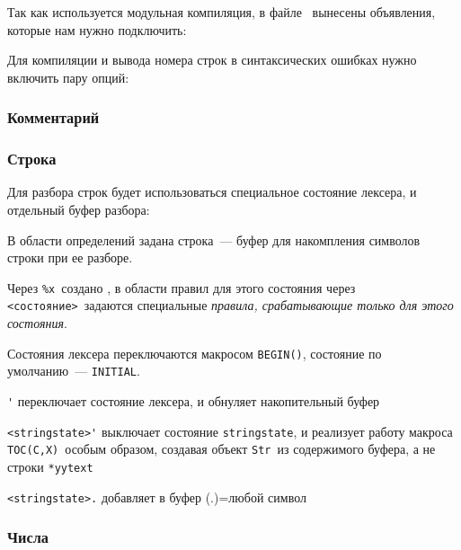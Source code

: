 \label{bilex}

Так как используется модульная компиляция, в файле \ вынесены
объявления, которые нам нужно подключить: 


Для компиляции и вывода номера строк в синтаксических ошибках
нужно включить пару опций:
 

\subsubsection{Комментарий}


\subsubsection{Строка}\label{lexstring}

Для разбора строк будет использоваться специальное состояние лексера,
и отдельный буфер разбора:  


В области определений задана строка\ --- буфер для накомпления символов строки
при ее разборе.

Через \verb|%x|\ создано ,
в области правил для этого состояния через \verb|<состояние>|\ задаются 
специальные \emph{правила, срабатывающие только для этого состояния}.

Состояния лексера переключаются макросом \verb|BEGIN()|, состояние по 
умолчанию\ --- \verb|INITIAL|.

\begin{description}
\item{\verb|'|} переключает состояние лексера, и обнуляет накопительный буфер
\item{\verb|<stringstate>'|} выключает состояние \verb|stringstate|,
и реализует работу макроса \verb|TOC(C,X)|\ особым образом, создавая объект
\verb|Str|\ из содержимого буфера, а не строки \verb|*yytext|
\item{\verb|<stringstate>.|} добавляет в буфер (.)=любой символ
\end{description}

\subsubsection{Числа}\label{lexnumbers}

